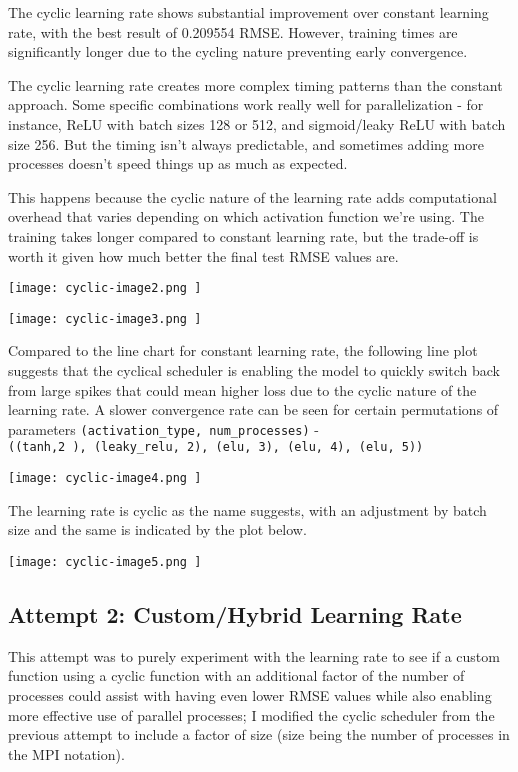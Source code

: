 \documentclass{article}
\begin{document}
The cyclic learning rate shows substantial improvement over constant learning rate, with the best result of 0.209554 RMSE. However, training times are significantly longer due to the cycling nature preventing early convergence.

The cyclic learning rate creates more complex timing patterns than the constant approach. Some specific combinations work really well for parallelization - for instance, ReLU with batch sizes 128 or 512, and sigmoid/leaky ReLU with batch size 256. But the timing isn't always predictable, and sometimes adding more processes doesn't speed things up as much as expected.

This happens because the cyclic nature of the learning rate adds computational overhead that varies depending on which activation function we're using. The training takes longer compared to constant learning rate, but the trade-off is worth it given how much better the final test RMSE values are.

\begin{center}
\texttt{[image: cyclic-image2.png ]}
\end{center}

\begin{center}
\texttt{[image: cyclic-image3.png ]}
\end{center}

Compared to the line chart for constant learning rate, the following line plot suggests that the cyclical scheduler is enabling the model to quickly switch back from large spikes that could mean higher loss due to the cyclic nature of the learning rate. A slower convergence rate can be seen for  certain permutations of parameters \verb|(activation_type, num_processes)| - \\ \verb|((tanh,2 ), (leaky_relu, 2), (elu, 3), (elu, 4), (elu, 5))|

\begin{center}
\texttt{[image: cyclic-image4.png ]}
\end{center}

The learning rate is cyclic as the name suggests, with an adjustment by batch size and the same is indicated by the plot below.

\begin{center}
\texttt{[image: cyclic-image5.png ]}
\end{center}

\subsection {Attempt 2: Custom/Hybrid Learning Rate }
This attempt was to purely experiment with the learning rate to see if a custom function using a cyclic function with an additional factor of the number of processes could assist with having even lower RMSE values while also enabling more effective use of parallel processes; I modified the cyclic scheduler from the previous attempt to include a factor of size (size being the number of processes in the MPI notation).
\end{document}
